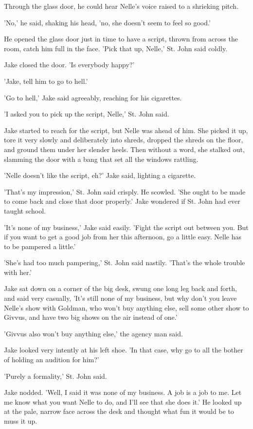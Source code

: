 \documentclass{novel}
\begin{document}
Through the glass door, he could hear Nelle’s voice raised to a shrieking pitch.

'No,' he said, shaking his head, 'no, she doesn’t seem to feel so good.'

He opened the glass door just in time to have a script, thrown from across the room, catch him full in the face. 'Pick that up, Nelle,' St. John said coldly.

Jake closed the door. 'Is everybody happy?'

'Jake, tell him to go to hell.'

'Go to hell,' Jake said agreeably, reaching for his cigarettes.

'I asked you to pick up the script, Nelle,' St. John said.

Jake started to reach for the script, but Nelle was ahead of him. She picked it up, tore it very slowly and deliberately into shreds, dropped the shreds on the floor, and ground them under her slender heels. Then without a word, she stalked out, slamming the door with a bang that set all the windows rattling.

'Nelle doesn’t like the script, eh?' Jake said, lighting a cigarette.

'That’s my impression,' St. John said crisply. He scowled. 'She ought to be made to come back and close that door properly.' Jake wondered if St. John had ever taught school.

'It’s none of my business,' Jake said easily. 'Fight the script out between you. But if you want to get a good job from her this afternoon, go a little easy. Nelle has to be pampered a little.'

'She’s had too much pampering,' St. John said nastily. 'That’s the whole trouble with her.'

Jake sat down on a corner of the big desk, swung one long leg back and forth, and said very casually, 'It’s still none of my business, but why don’t you leave Nelle’s show with Goldman, who won’t buy anything else, sell some other show to Givvus, and have two big shows on the air instead of one.'

'Givvus also won’t buy anything else,' the agency man said.

Jake looked very intently at his left shoe. 'In that case, why go to all the bother of holding an audition for him?'

'Purely a formality,' St. John said.

Jake nodded. 'Well, I said it was none of my business. A job is a job to me. Let me know what you want Nelle to do, and I'll see that she does it.' He looked up at the pale, narrow face across the desk and thought what fun it would be to muss it up.
\end{document}
